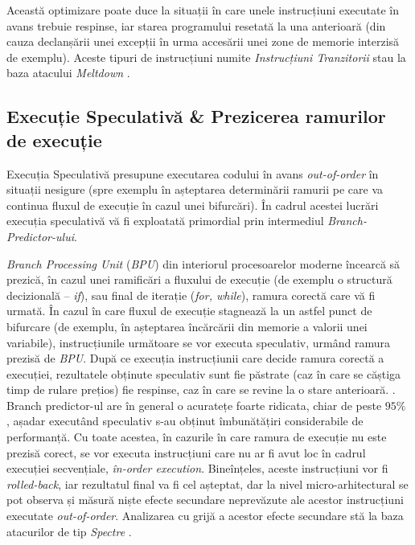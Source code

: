 Această optimizare poate duce la situații în care unele instrucțiuni executate în
avans trebuie respinse, iar starea programului resetată la una anterioară (din
cauza declanșării unei excepții în urma accesării unei zone de memorie interzisă
de exemplu). Aceste tipuri de instrucțiuni numite \emph{Instrucțiuni
Tranzitorii} stau la baza atacului \emph{Meltdown} \cite{meltdown2018}.

\subsection{Execuție Speculativă \& Prezicerea ramurilor de execuție}
\label{sec:branch_prediction}

Execuția Speculativă presupune executarea codului în avans \emph{out-of-order}
în situații nesigure (spre exemplu în așteptarea determinării ramurii 
pe care va continua fluxul de execuție în cazul unei bifurcări). În cadrul
acestei lucrări execuția speculativă vă fi exploatată primordial prin intermediul 
\emph{Branch-Predictor-ului}.

\emph{Branch Processing Unit} (\emph{BPU}) din interiorul procesoarelor moderne
încearcă să prezică, în cazul unei ramificări a fluxului de execuție (de
exemplu o structură decizională -- \emph{if}), sau final de iterație
(\emph{for, while}), ramura corectă care vă fi urmată. În cazul în care fluxul
de execuție stagnează la un astfel punct de bifurcare (de exemplu, în
așteptarea încărcării din memorie a valorii unei variabile), instrucțiunile
următoare se vor executa speculativ, urmând ramura prezisă de \emph{BPU}. După
ce execuția instrucțiunii care decide ramura corectă a execuției, rezultatele
obținute speculativ sunt fie păstrate (caz în care se căștiga timp de rulare
prețios) fie respinse, caz în care se revine la o stare anterioară.
\cite{spectre2019}. \\

Branch predictor-ul are în general o acuratețe foarte ridicata, chiar de peste
$95\%$ \cite{what_is_speculative_execution}, așadar executând speculativ s-au
obținut îmbunătățiri considerabile de performanță. Cu toate acestea, în
cazurile în care ramura de execuție nu este prezisă corect, se vor executa
instrucțiuni care nu ar fi avut loc în cadrul execuției secvențiale,
\emph{în-order execution}. Bineînțeles, aceste instrucțiuni vor fi
\emph{rolled-back}, iar rezultatul final va fi cel așteptat, dar la nivel
micro-arhitectural se pot observa și măsură niște efecte secundare neprevăzute
ale acestor instrucțiuni executate \emph{out-of-order}. Analizarea cu grijă a
acestor efecte secundare stă la baza atacurilor de tip \emph{Spectre}
\cite{spectre2019}.


